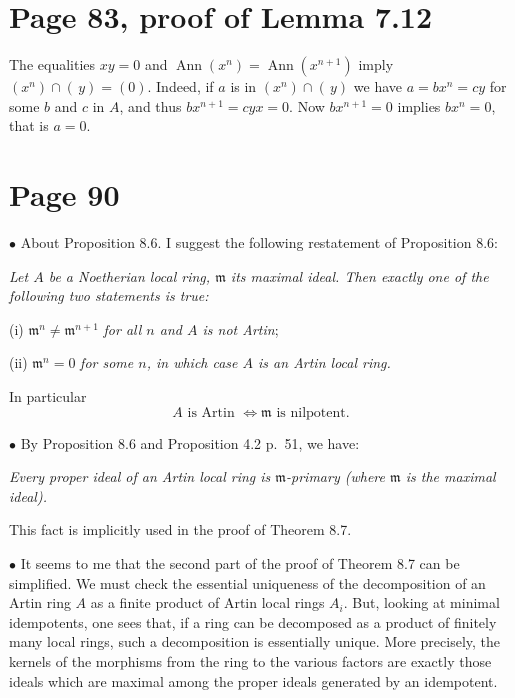 \documentclass[parskip=half]{scrartcl}%
\newcommand{\oo}{\operatorname}
\newcommand{\mf}{\mathfrak}
\newcommand{\bu}{\bullet}
\begin{document}
\section{Page 83, proof of Lemma 7.12}%

The equalities $xy=0$ and $\oo{Ann}(x^n)=\oo{Ann}(x^{n+1})$ imply $(x^n)\cap(\,y)=(0)$. Indeed, if $a$ is in $(x^n)\cap(\,y)$ we have $a=bx^n=cy$ for some $b$ and $c$ in $A$, and thus $bx^{n+1}=cyx=0$. Now $bx^{n+1}=0$ implies $bx^n=0$, that is $a=0$. 


\section{Page 90}%

$\bu$ About Proposition 8.6. I suggest the following restatement of Proposition 8.6:

\emph{Let $A$ be a Noetherian local ring, $\mf m$ its maximal ideal. Then exactly one of the following two statements is true:}

(i) $\mf m^n\ne\mf m^{n+1}$ \emph{for all $n$ and $A$ is \emph{not} Artin};

(ii) $\mf m^n=0$ \emph{for some $n$, in which case $A$ is an Artin local ring.}

In particular 
\begin{equation}\label{86}
A\text{ is Artin $\iff\mf m$ is nilpotent.}
\end{equation}%

$\bu$ By Proposition 8.6 and Proposition 4.2 p.~51, we have:

\emph{Every proper ideal of an Artin local ring is $\mf m$-primary (where $\mf m$ is the maximal ideal).} 

This fact is implicitly used in the proof of Theorem 8.7.

$\bu$ It seems to me that the second part of the proof of Theorem 8.7 can be simplified. We must check the essential uniqueness of the decomposition of an Artin ring $A$ as a finite product of Artin local rings $A_i$. But, looking at minimal idempotents, one sees that, if a ring can be decomposed as a product of finitely many local rings, such a decomposition is essentially unique. More precisely, the kernels of the morphisms from the ring to the various factors are exactly those ideals which are maximal among the proper ideals generated by an idempotent. %
\end{document}
